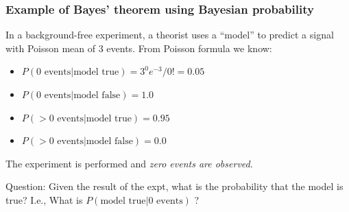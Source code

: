 \documentclass[9pt]{beamer}
\begin{document}
\begin{frame}
 \frametitle{Example  of Bayes' theorem using Bayesian probability}
 
 In a background-free experiment, a theorist uses a ``model'' to
predict a signal with Poisson mean of 3 events. From Poisson
formula we know:

\begin{itemize}
 \item $P(\text{0 events} | \text{model true}) = 3^0 e^{-3}/0! = 0.05$
 \item $P(\text{0 events} | \text{model false}) = 1.0$
 \item $P(>\text{0 events} | \text{model true}) = 0.95$
 \item $P(>\text{0 events} | \text{model false}) = 0.0$
\end{itemize}

The experiment is performed and \emph{zero events are observed}.

\vspace{10pt}

Question: Given the result of the expt, what is the probability that
the model is true? I.e., What is $P(\text{model true} | \text{0 events})$ ?

\vspace{10pt}


\end{frame}
\end{document}
